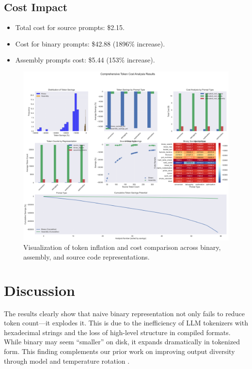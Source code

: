\documentclass{article}
\begin{document}
\subsection{Cost Impact}
\begin{itemize}
  \item Total cost for source prompts: \$2.15.
  \item Cost for binary prompts: \$42.88 (1896\% increase).
  \item Assembly prompts cost: \$5.44 (153\% increase).
\end{itemize}

\begin{figure}[h!]
  \centering
  \includegraphics[width=\linewidth]{comprehensive_analysis_results.png}
  \caption{Visualization of token inflation and cost comparison across binary, assembly, and source code representations.}
\end{figure}

\section{Discussion}
The results clearly show that naive binary representation not only fails to reduce token count—it explodes it. This is due to the inefficiency of LLM tokenizers with hexadecimal strings and the loss of high-level structure in compiled formats. While binary may seem “smaller” on disk, it expands dramatically in tokenized form.
This finding complements our prior work on improving output diversity through model and temperature rotation \cite{uniqueness2025}.
\end{document}
